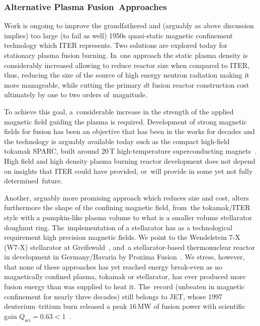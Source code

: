 \documentclass[particles,article,accept,pdftex,moreauthors]{Definitions/mdpi}
\begin{document}
\subsubsection{Alternative Plasma Fusion~Approaches}\label{sssec:INTnewPlasma}
Work is ongoing to improve the grandfathered and (arguably as above discussion implies) too large (to fail as well) 1950s quasi-static magnetic confinement technology which ITER represents. Two solutions are explored today for stationary plasma fusion burning. In~one approach the static plasma density is considerably increased allowing to reduce reactor size when compared to ITER, thus, reducing the size of the source of high energy neutron radiation making it more manageable, while cutting the primary $dt$ fusion reactor construction cost ultimately by one to two orders of~magnitude.

To achieve this goal, a~considerable increase in the strength of the applied magnetic field guiding the plasma is required. Development of strong magnetic fields for fusion has been an objective that has been in the works for decades and the technology is arguably available today such as the compact high-field tokamak SPARC, built around 20\,T high-temperature superconducting magnets~\cite{Creely:2020}. High field and high density plasma burning reactor development does not depend on insights that ITER could have provided, or~will provide in some yet not fully determined~future.

Another, arguably more promising approach which reduces size and cost, alters furthermore the shape of the confining magnetic field, from~the tokamak/ITER style with a pumpkin-like plasma volume to what is a smaller volume stellarator doughnut ring. The~implementation of a stellarator has as a technological requirement high precision magnetic fields. We point to the Wendelstein 7-X (\mbox{W7-X}) stellarator at Greifswald~\cite{Grulke:2024}, and~a stellarator-based thermonuclear reactor in development in Germany/Bavaria by Proxima Fusion~\cite{Lion:2025}. We stress, however, that none of these approaches has yet reached energy break-even as no magnetically confined plasma, tokamak or stellarator, has ever produced more fusion energy than was supplied to heat it. The~record (unbeaten in magnetic confinement for nearly three decades) still belongs to JET, whose 1997 deuterium--tritium burn released a peak $16\,\mathrm{MW}$ of fusion power with scientific gain $Q_\mathrm{sci}=0.63<1$~\cite{Keilhacker:1999,Wurzel:2025}.
\end{document}

